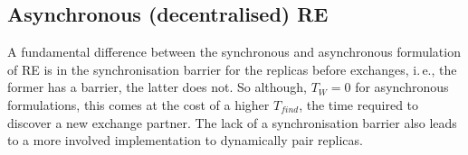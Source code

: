 \documentclass{rspublic}
\newcommand{\alnote}[1]{ {\textcolor{blue} { ***andre: #1 }}}
\newcommand{\athotanote}[1]{ {\textcolor{green} { ***athota: #1 }}}
\newcommand{\alnote}[1]{}
\newcommand{\athotanote}[1]{}
\begin{document}
\subsection{Asynchronous (decentralised) RE}





A fundamental difference between the synchronous and asynchronous
formulation of RE is in the synchronisation barrier for the replicas
before exchanges, i.\,e., the former has a barrier, the latter does not.
So although, $T_W = 0$ for asynchronous formulations, this comes at
the cost of a higher $T_{find}$, the time required to discover a new
exchange partner. The lack of a synchronisation barrier
also leads to a more involved implementation to dynamically pair replicas.
\end{document}
